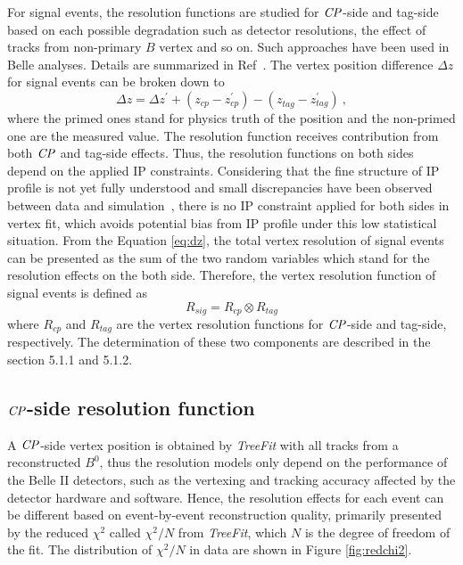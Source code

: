 For signal events, the resolution functions are studied for $\it{CP}$-side and tag-side based on each possible degradation such as detector resolutions, the effect of tracks from non-primary $B$ vertex and so on. Such approaches have been used in Belle analyses. Details are summarized in Ref~\cite{Yusa-note}. The vertex position difference $\Delta z$ for signal events can be broken down to 
\begin{equation}\label{eq:dz}
\Delta z 
=\Delta z^{'} + (z_{cp}^{}- z_{cp}^{'}) - (z_{tag}^{}- z_{tag}^{'}) ~,
\end{equation}
where the primed ones stand for physics truth of the position and the non-primed one are the measured value. The resolution function receives contribution from both $\it{CP}$ and tag-side effects. Thus, the resolution functions on both sides depend on the applied IP constraints. Considering that the fine structure of IP profile is not yet fully understood and small discrepancies have been observed between data and simulation~\cite{jpsiks_ichep}, there is no IP constraint applied for both sides in vertex fit, which avoids potential bias from  IP profile under this low statistical situation. From the Equation \ref{eq:dz}, the total vertex resolution of signal events can be presented as the sum of the two random variables which stand for the resolution effects on the both side. Therefore, the vertex resolution function of signal events is defined as
\begin{equation}\label{eq:Rsig}
R_{sig}=R_{cp}\otimes R_{tag}
\end{equation}
where $R_{cp}$ and $R_{tag}$ are the vertex resolution functions for $\it{CP}$-side and tag-side, respectively. 
The determination of these two components are described in the section 5.1.1 and 5.1.2.
\subsection{$\it{CP}$-side resolution function}
A $\it{CP}$-side vertex position is obtained by \textit{TreeFit} with all tracks from a reconstructed $B^0$, thus the resolution models only depend on the performance of the Belle II detectors, such as the vertexing and tracking accuracy affected by the detector hardware and software. Hence, the resolution effects for each event can be different based on event-by-event reconstruction quality, primarily presented by the reduced $\chi^2$ called $\chi^2/N$ from \textit{TreeFit}, which $N$ is the degree of freedom of the fit. The distribution of $\chi^2/N$ in data are shown in Figure \ref{fig:redchi2}. 

